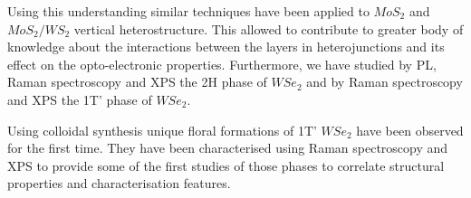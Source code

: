 Using this understanding similar techniques have been applied to $MoS_2$ and $MoS_2/WS_2$ vertical heterostructure. This allowed to contribute to greater body of knowledge about the interactions between the layers in heterojunctions and its effect on the opto-electronic properties. Furthermore, we have studied by PL, Raman spectroscopy and XPS the 2H phase of $WSe_2$ and by Raman spectroscopy and XPS the 1T’ phase of $WSe_2$.

Using colloidal synthesis unique floral formations of 1T' $WSe_2$ have been observed for the first time. They have been characterised using Raman spectroscopy and XPS to provide some of the first studies of those phases to correlate structural properties and characterisation features. 